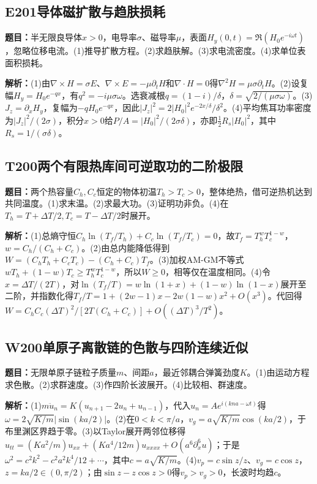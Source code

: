 \subsection*{E201\quad 导体磁扩散与趋肤损耗}
\textbf{题目：}半无限良导体$x>0$，电导率$\sigma$、磁导率$\mu$，表面$H_y(0,t)=\Re(H_0e^{-i\omega t})$，忽略位移电流。(1)推导扩散方程。(2)求趋肤解。(3)求电流密度。(4)求单位表面积损耗。
\par\textbf{解析：}(1)由$\nabla\times H=\sigma E$、$\nabla\times E=-\mu\partial_tH$和$\nabla\cdot H=0$得$\nabla^2H=\mu\sigma\partial_tH$。(2)设复幅$H_y=H_0e^{-qx}$，有$q^2=-i\mu\sigma\omega$。选衰减根$q=(1-i)/\delta$，$\delta=\sqrt{2/(\mu\sigma\omega)}$。(3)$J_z=\partial_xH_y$，复幅为$-qH_0e^{-qx}$，因此$|J_z|^2=2|H_0|^2e^{-2x/\delta}/\delta^2$。(4)平均焦耳功率密度为$|J_z|^2/(2\sigma)$，积分$x>0$给$P/A=|H_0|^2/(2\sigma\delta)$，亦即$\frac12R_s|H_0|^2$，其中$R_s=1/(\sigma\delta)$。
\par\medskip
\subsection*{T200\quad 两个有限热库间可逆取功的二阶极限}
\textbf{题目：}两个热容量$C_h,C_c$恒定的物体初温$T_h>T_c>0$，整体绝热，借可逆热机达到共同温度。(1)求末温。(2)求最大功。(3)证明功非负。(4)在$T_h=T+\Delta T/2,T_c=T-\Delta T/2$时展开。
\par\textbf{解析：}(1)总熵守恒$C_h\ln(T_f/T_h)+C_c\ln(T_f/T_c)=0$，故$T_f=T_h^wT_c^{1-w}$，$w=C_h/(C_h+C_c)$。(2)由总内能降低得到$W=(C_hT_h+C_cT_c)-(C_h+C_c)T_f$。(3)加权AM-GM不等式$wT_h+(1-w)T_c\ge T_h^wT_c^{1-w}$，所以$W\ge0$，相等仅在温度相同。(4)令$x=\Delta T/(2T)$，对$\ln(T_f/T)=w\ln(1+x)+(1-w)\ln(1-x)$展开至二阶，并指数化得$T_f/T=1+(2w-1)x-2w(1-w)x^2+O(x^3)$。代回得$W=C_hC_c(\Delta T)^2/[2T(C_h+C_c)]+O((\Delta T)^3/T^2)$。
\par\medskip
\subsection*{W200\quad 单原子离散链的色散与四阶连续近似}
\textbf{题目：}无限单原子链粒子质量$m$、间距$a$，最近邻耦合弹簧劲度$K$。(1)由运动方程求色散。(2)求群速度。(3)作四阶长波展开。(4)比较相、群速度。
\par\textbf{解析：}(1)$m\ddot u_n=K(u_{n+1}-2u_n+u_{n-1})$，代入$u_n=Ae^{i(kna-\omega t)}$得$\omega=2\sqrt{K/m}|\sin(ka/2)|$。(2)在$0<k<\pi/a$，$v_g=a\sqrt{K/m}\cos(ka/2)$，于布里渊区界趋于零。(3)以Taylor展开两邻位移得$u_{tt}=(Ka^2/m)u_{xx}+(Ka^4/12m)u_{xxxx}+O(a^6\partial_x^6u)$；于是$\omega^2=c^2k^2-c^2a^2k^4/12+\cdots$，其中$c=a\sqrt{K/m}$。(4)$v_p=c\sin z/z$、$v_g=c\cos z$，$z=ka/2\in(0,\pi/2)$；由$\sin z-z\cos z>0$得$v_p>v_g>0$，长波时均趋$c$。
\par\medskip
